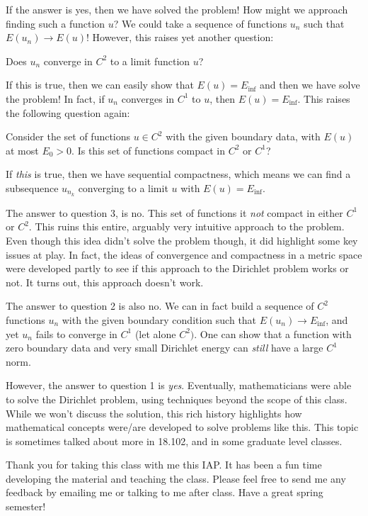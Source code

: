 If the answer is yes, then we have solved the problem! How might we approach finding such a function $u$? We could take a sequence of functions $u_n$ such that $E(u_n) \to E(u)$! However, this raises yet another question:
\begin{question}[Question 2]
Does $u_n$ converge in $C^2$ to a limit function $u$?
\end{question}

If this is true, then we can easily show that $E(u) = E_{\text{inf}}$ and then we have solve the problem! In fact, if $u_n$ converges in $C^1$ to $u$, then $E(u)=E_{\text{inf}}$. This raises the following question again:
\begin{question}[Question 3]
Consider the set of functions $u\in C^2$ with the given boundary data, with $E(u)$ at most $E_0>0$. Is this set of functions compact in $C^2$ or $C^1$? 
\end{question}
If \textit{this} is true, then we have sequential compactness, which means we can find a subsequence $u_{n_k}$ converging to a limit $u$ with $E(u) = E_{\text{inf}}$.

The answer to question 3, is no. This set of functions it \textit{not} compact in either $C^1$ or $C^2$. This ruins this entire, arguably very intuitive approach to the problem. Even though this idea didn't solve the problem though, it did highlight some key issues at play. In fact, the ideas of convergence and compactness in a metric space were developed partly to see if this approach to the Dirichlet problem works or not. It turns out, this approach doesn't work.

The answer to question 2 is also no. We can in fact build a sequence of $C^2$ functions $u_n$ with the given boundary condition such that $E(u_n) \to E_{\text{inf}}$, and yet $u_n$ fails to converge in $C^1$ (let alone $C^2)$. One can show that a function with zero boundary data and very small Dirichlet energy can \textit{still} have a large $C^1$ norm.

However, the answer to question 1 is \textit{yes}. Eventually, mathematicians were able to solve the Dirichlet problem, using techniques beyond the scope of this class. While we won't discuss the solution, this rich history highlights how mathematical concepts were/are developed to solve problems like this. This topic is sometimes talked about more in 18.102, and in some graduate level classes.

Thank you for taking this class with me this IAP. It has been a fun time developing the material and teaching the class. Please feel free to send me any feedback by emailing me or talking to me after class. Have a great spring semester!